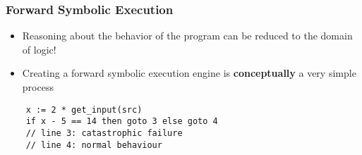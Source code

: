 \begin{frame}[fragile]
	\frametitle{Forward Symbolic Execution}
	\begin{itemize}
		\item Reasoning about the behavior of the program can be reduced to the domain of logic!
		\item Creating a forward symbolic execution engine is \textbf{conceptually} a very simple process
	\end{itemize}
	\begin{lstlisting}
	x := 2 * get_input(src)
	if x - 5 == 14 then goto 3 else goto 4
	// line 3: catastrophic failure
	// line 4: normal behaviour
	\end{lstlisting}
\end{frame}